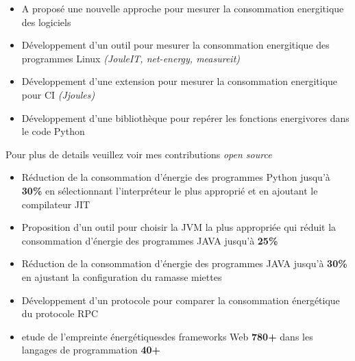 \documentclass[10pt,a4paper,ragged2e,withhyper]{altacv}
\begin{document}
\begin{paracol}{2}
  \medskip

  \begin{itemize}
    \item A proposé une nouvelle approche pour mesurer la consommation energitique des logiciels
    \item Développement d'un outil pour mesurer la consommation energitique des programmes Linux \emph{(JouleIT, net-energy, measureit)}
    \item Développement d'une extension pour mesurer la consommation energitique pour CI \emph{(Jjoules)}
    \item Développement d'une bibliothèque pour repérer les fonctions energivores dans le code Python
  \end{itemize}
  Pour plus de details veuillez voir mes contributions \emph{open source}
  \\
  \begin{itemize}
    \item Réduction de la consommation d'énergie des programmes Python jusqu'à \textbf{30\%} en sélectionnant l'interpréteur le plus approprié et en ajoutant le compilateur JIT
    \item Proposition  d'un outil pour choisir la JVM la plus appropriée qui réduit la consommation d'énergie des programmes JAVA jusqu'à \textbf{25\%}
    \item Réduction de la consommation d'énergie des programmes JAVA jusqu'à \textbf{30\%} en ajustant la configuration du ramasse miettes
  \end{itemize}
  \begin{itemize}
    \item Développement d'un protocole pour comparer la consommation énergétique du protocole RPC
    \item etude de l'empreinte énergétiquesdes frameworks Web \textbf{780+} dans les langages de programmation \textbf{40+}
  \end{itemize}

\end{paracol}
\end{document}
